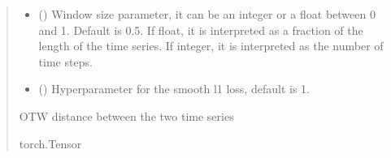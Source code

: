 \documentclass[letterpaper,10pt,english]{sphinxmanual}
\begin{document}
\begin{fulllineitems}
\begin{quote}
\begin{description}
\begin{itemize}
\item {} 
\sphinxAtStartPar
{} (\sphinxstyleliteralemphasis{\sphinxupquote{ | }}) \textendash{} Window size parameter, it can be an integer or a float between 0 and 1. Default is 0.5.
If float, it is interpreted as a fraction of the length of the time series.
If integer, it is interpreted as the number of time steps.

\item {} 
\sphinxAtStartPar
{} () \textendash{} Hyperparameter for the smooth l1 loss, default is 1.

\end{itemize}

\sphinxAtStartPar
OTW distance between the two time series

\sphinxAtStartPar
torch.Tensor

\end{description}\end{quote}

\end{fulllineitems}

\end{document}
